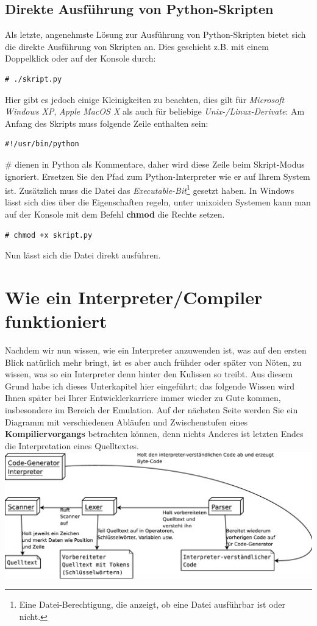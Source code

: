 \documentclass[b5paper,10pt,dvips,fleqn,titlepage,twoside]{book}
\begin{document}
\subsection{Direkte Ausführung von Python-Skripten}
Als letzte, angenehmste Lösung zur Ausführung von Python-Skripten bietet sich die direkte Ausführung von Skripten an. Dies geschieht z.B. mit einem Doppelklick oder auf der Konsole durch:
\begin{lstlisting}
# ./skript.py
\end{lstlisting}
Hier gibt es jedoch einige Kleinigkeiten zu beachten, dies gilt für \emph{Microsoft Windows XP}, \emph{Apple MacOS X} als auch für beliebige \emph{Unix-/Linux-Derivate}:
Am Anfang des Skripts muss folgende Zeile enthalten sein:
\begin{lstlisting}
#!/usr/bin/python
\end{lstlisting}
\# dienen in Python als Kommentare, daher wird diese Zeile beim Skript-Modus ignoriert. Ersetzen Sie den Pfad zum Python-Interpreter wie er auf Ihrem System ist.
Zusätzlich muss die Datei das \emph{Executable-Bit}\footnote{Eine Datei-Berechtigung, die anzeigt, ob eine Datei ausführbar ist oder nicht.} gesetzt haben. In Windows lässt sich dies über die Eigenschaften regeln, unter unixoiden Systemen kann man auf der Konsole mit dem Befehl \textbf{chmod} die Rechte setzen.
\begin{lstlisting}
# chmod +x skript.py
\end{lstlisting}
Nun lässt sich die Datei direkt ausführen.
\section{Wie ein Interpreter/Compiler funktioniert}
Nachdem wir nun wissen, wie ein Interpreter anzuwenden ist, was auf den ersten Blick natürlich mehr bringt, ist es aber auch frühder oder später von Nöten, zu wissen, was so ein Interpreter denn hinter den Kulissen so treibt.
Aus diesem Grund habe ich dieses Unterkapitel hier eingeführt; das folgende Wissen wird Ihnen später bei Ihrer Entwicklerkarriere immer wieder zu Gute kommen, insbesondere im Bereich der Emulation.\newline
Auf der nächsten Seite werden Sie ein Diagramm mit verschiedenen Abläufen und Zwischenstufen eines \textbf{Kompiliervorgangs} betrachten können, denn nichts Anderes ist letzten Endes die Interpretation eines Quelltextes.
\newpage
\includegraphics[width=15cm]{interpreter-diagramm.eps}
\newline
\end{document}
